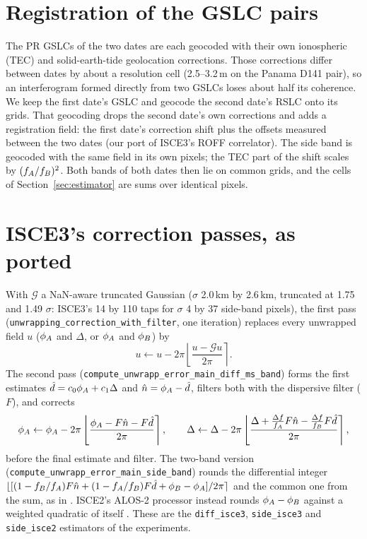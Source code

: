 \section{Registration of the GSLC pairs}
\label{app:registration}
The PR GSLCs of the two dates are each geocoded with their own ionospheric (TEC) and solid-earth-tide geolocation
corrections. Those corrections differ between dates by about a resolution cell (2.5--3.2\,m on the Panama D141 pair),
so an interferogram formed directly from two GSLCs loses about half its coherence. We keep the first date's GSLC and
geocode the second date's RSLC onto its grids. That geocoding drops the second date's own corrections and adds a
registration field: the first date's correction shift plus the offsets measured between the two dates (our port of
ISCE3's ROFF correlator). The side band is geocoded with the same field in its own pixels; the TEC part of the shift
scales by $(f_A/f_B)^2$. Both bands of both dates then lie on common grids, and the cells of
Section~\ref{sec:estimator} are sums over identical pixels.

\section{ISCE3's correction passes, as ported}
\label{app:isce3}
With $\mathcal{G}$ a NaN-aware truncated Gaussian ($\sigma$ 2.0\,km by 2.6\,km, truncated at 1.75 and 1.49 $\sigma$:
ISCE3's 14 by 110 taps for $\sigma$ 4 by 37 side-band pixels), the first pass
(\texttt{unwrapping\_correction\_with\_filter}, one iteration) replaces every unwrapped field $u$ ($\phi_A$ and
$\Delta$, or $\phi_A$ and $\phi_B$) by
\begin{equation}
  u \leftarrow u - 2\pi \left\lfloor \frac{u - \mathcal{G}u}{2\pi} \right\rceil .
\end{equation}
The second pass (\texttt{compute\_unwrapp\_error\_main\_diff\_ms\_band}) forms the first estimates
$\hat d = c_0\phi_A + c_1\Delta$ and $\hat n = \phi_A - \hat d$, filters both with the dispersive filter ($F$), and
corrects
\begin{equation}
  \phi_A \leftarrow \phi_A - 2\pi\left\lfloor\frac{\phi_A - F\hat n - F\hat d}{2\pi}\right\rceil,\qquad
  \Delta \leftarrow \Delta - 2\pi\left\lfloor\frac{\Delta + \frac{\Delta f}{f_A}F\hat n - \frac{\Delta f}{f_B}F\hat d}
  {2\pi}\right\rceil ,
\end{equation}
before the final estimate and filter. The two-band version
(\texttt{compute\_unwrapp\_error\_main\_side\_band}) rounds the differential integer
$\lfloor[(1-f_B/f_A)F\hat n + (1-f_A/f_B)F\hat d + \phi_B - \phi_A]/2\pi\rceil$ and the common one from the sum, as in
\citet[eqs.~28--29]{gomba2016toward}. ISCE2's ALOS-2 processor instead rounds $\phi_A-\phi_B$ against a weighted
quadratic of itself \citep{liang2018insar}. These are the \texttt{diff\_isce3}, \texttt{side\_isce3} and
\texttt{side\_isce2} estimators of the experiments.

